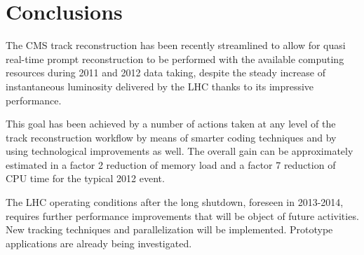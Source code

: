 \section{Conclusions}
\label{conclusions}

The CMS track reconstruction has been recently streamlined to allow
for quasi real-time prompt reconstruction to be performed with the
available computing resources during 2011 and 2012 data taking,
despite the steady increase of instantaneous luminosity delivered by
the LHC thanks to its impressive performance.

This goal has been achieved by a number of actions taken at any level
of the track reconstruction workflow by means of smarter coding
techniques and by using technological improvements as well. The
overall gain can be approximately estimated in a factor 2 
reduction of memory load and a factor 7 reduction of CPU time for the
typical 2012 event.

The LHC operating conditions after the long shutdown, foreseen in
2013-2014, requires further performance improvements that will be
object of future activities. New tracking techniques and
parallelization will be implemented. Prototype applications are
already being investigated.
